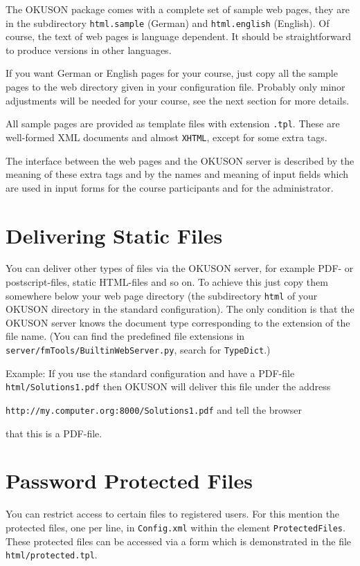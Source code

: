 \documentclass[12pt,openany,a4paper]{book}
\newcommand{\OKUSON}{\textsf{OKUSON}}
\begin{document}
The {\OKUSON} package comes with a complete set of sample web pages, they
are in the subdirectory \verb+html.sample+ (German) and \verb+html.english+
(English). Of course, the text of web pages is language dependent. 
It should be straightforward to produce versions in other languages.

If you want German or English pages for your course,  just copy all the
sample pages to the web directory given in your configuration file. 
Probably  only minor adjustments will be needed for your course, see the
next section for more details.

All sample pages are provided as template files with extension
\texttt{.tpl}. These are well-formed XML documents and almost
\texttt{XHTML}, except for some extra tags.

The interface between the web pages and the {\OKUSON} server is described by
the meaning of these extra tags and by the names and meaning of input 
fields which are used in input forms for the course participants and for
the administrator. 

\section{Delivering Static Files}

You can deliver other types of files via the {\OKUSON} server, for example
PDF- or postscript-files, static HTML-files and so on. To achieve this
just copy them somewhere below your web page directory (the subdirectory 
\texttt{html} of your {\OKUSON} directory in the standard configuration).
The only condition is that the {\OKUSON} server knows the document type 
corresponding to the extension of the file name. (You can find the
predefined file extensions in \texttt{server/fmTools/BuiltinWebServer.py}, 
search for \texttt{TypeDict}.)

Example: If you use the standard configuration and have a 
PDF-file \texttt{html/Solutions1.pdf} then 
{\OKUSON} will deliver this file under the address

\hspace{1cm}  
\texttt{http://my.computer.org:8000/Solutions1.pdf} and tell the browser

that this is a PDF-file. 

\section{Password Protected Files}

You can restrict access to certain files to registered users. For this 
mention the protected files, one per line, in \texttt{Config.xml} 
within the element \texttt{ProtectedFiles}. These protected files can be
accessed via a form which is demonstrated in the file
\texttt{html/protected.tpl}.
\end{document}
